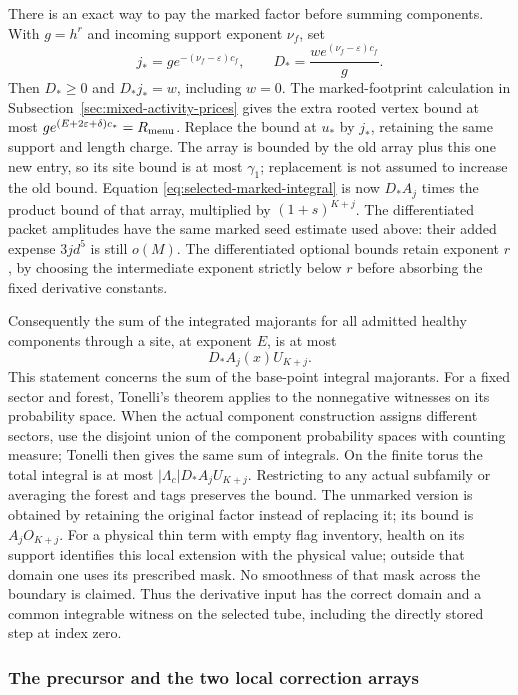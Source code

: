 There is an exact way to pay the marked factor before summing
components. With $g=h^r$ and incoming support exponent $\nu_f$, set
\[
 j_*=g e^{-(\nu_f-\varepsilon)c_f},\qquad
 D_*=\frac{w e^{(\nu_f-\varepsilon)c_f}}g.
\]
Then $D_*\ge0$ and $D_*j_*=w$, including $w=0$.
The marked-footprint calculation in
Subsection~\ref{sec:mixed-activity-prices} gives the extra rooted vertex
bound at most $g e^{(E+2\varepsilon+\delta)c_*}=R_{\rm menu}$.
Replace the bound at $u_*$ by $j_*$, retaining the same support and
length charge. The array is bounded by the old array plus this one
new entry, so its site bound is at most $\gamma_1$; replacement is
not assumed to increase the old bound. Equation
\eqref{eq:selected-marked-integral} is now $D_* A_j$ times the
product bound of that array, multiplied by $(1+s)^{K+j}$.
The differentiated packet amplitudes have the same marked seed
estimate used above: their added expense $3j d^5$ is still $o(M)$.
The differentiated optional bounds retain exponent $r$, by choosing
the intermediate exponent strictly below $r$ before absorbing the
fixed derivative constants.

Consequently the sum of the integrated majorants for all admitted
healthy components through a site, at exponent $E$, is at most
\begin{equation}\label{eq:selected-marked-root}
                 D_* A_j(x) U_{K+j}.
\end{equation}
This statement concerns the sum of the base-point integral majorants.
For a fixed sector and forest, Tonelli's theorem applies to the
nonnegative witnesses on its probability space. When the actual
component construction assigns different sectors, use the disjoint
union of the component probability spaces with counting measure;
Tonelli then gives the same sum of integrals. On the finite torus
the total integral is at most
$|\Lambda_c|D_* A_j U_{K+j}$. Restricting to any actual subfamily
or averaging the forest and tags preserves the bound. The unmarked
version is obtained by retaining the original factor instead of
replacing it; its bound is $A_jO_{K+j}$.
For a physical thin term with empty flag inventory, health on its
support identifies this local extension with the physical value;
outside that domain one uses its prescribed mask. No smoothness of
that mask across the boundary is claimed. Thus the derivative input
has the correct domain and a common integrable witness on the
selected tube, including the directly stored step at index zero.

\subsubsection{The precursor and the two local correction arrays}
\label{sec:selected-precursor-vapor}

